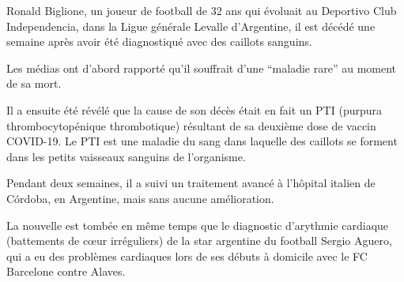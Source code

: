 Ronald Biglione, un joueur de football de 32 ans qui évoluait au Deportivo Club
Independencia, dans la Ligue générale Levalle d'Argentine, il est décédé une
semaine après avoir été diagnostiqué avec des caillots sanguins.

Les médias ont d'abord rapporté qu'il souffrait d'une ``maladie rare'' au moment
de sa mort.

Il a ensuite été révélé que la cause de son décès était en fait un PTI (purpura
thrombocytopénique thrombotique) résultant de sa deuxième dose de vaccin
COVID-19. Le PTI est une maladie du sang dans laquelle des caillots se forment
dans les petits vaisseaux sanguins de l'organisme.

Pendant deux semaines, il a suivi un traitement avancé à l'hôpital italien de
Córdoba, en Argentine, mais sans aucune amélioration.

La nouvelle est tombée en même temps que le diagnostic d'arythmie cardiaque
(battements de cœur irréguliers) de la star argentine du football Sergio Aguero,
qui a eu des problèmes cardiaques lors de ses débuts à domicile avec le FC
Barcelone contre Alaves.
